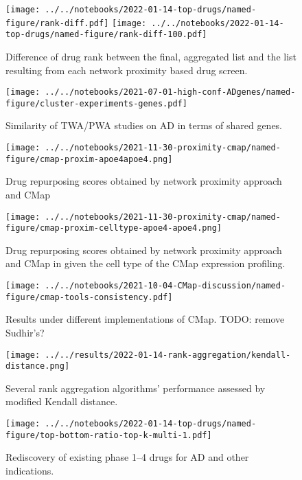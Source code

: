 \documentclass[letterpaper]{article}
\begin{document}
\begin{figure}[p]
\texttt{[image: ../../notebooks/2022-01-14-top-drugs/named-figure/rank-diff.pdf]}
\texttt{[image: ../../notebooks/2022-01-14-top-drugs/named-figure/rank-diff-100.pdf]}
\caption{
Difference of drug rank between the final, aggregated list and the list
resulting from each network proximity based drug screen.
}
\label{fig:rank-diff}
\end{figure}


\begin{figure}
\texttt{[image: ../../notebooks/2021-07-01-high-conf-ADgenes/named-figure/cluster-experiments-genes.pdf]}
\caption{
Similarity of TWA/PWA studies on AD in terms of shared genes.
}
\label{fig:twas-clustermap}
\end{figure}

\begin{figure}[p]
\texttt{[image: ../../notebooks/2021-11-30-proximity-cmap/named-figure/cmap-proxim-apoe4apoe4.png]}
\caption{
Drug repurposing scores obtained by network proximity approach and CMap
}
\label{fig:proxim-cmap}
\end{figure}

\begin{figure}[p]
\texttt{[image: ../../notebooks/2021-11-30-proximity-cmap/named-figure/cmap-proxim-celltype-apoe4-apoe4.png]}
\caption{
Drug repurposing scores obtained by network proximity approach and CMap in
given the cell type of the CMap expression profiling.
}
\label{fig:proxim-cmap-celltype}
\end{figure}

\begin{figure}[p]
\texttt{[image: ../../notebooks/2021-10-04-CMap-discussion/named-figure/cmap-tools-consistency.pdf]}
\caption{
Results under different implementations of CMap.
TODO: remove Sudhir's?
}
\label{fig:cmap-cmap}
\end{figure}

\begin{figure}[p]
\texttt{[image: ../../results/2022-01-14-rank-aggregation/kendall-distance.png]}
\caption{
Several rank aggregation algorithms' performance assessed by modified Kendall
distance.
}
\label{fig:kendall-dist}
\end{figure}

\begin{figure}[p]
\texttt{[image: ../../notebooks/2022-01-14-top-drugs/named-figure/top-bottom-ratio-top-k-multi-1.pdf]}
\caption{
Rediscovery of existing phase 1--4 drugs for AD and other indications.
}
\label{fig:ad-drug-rediscovery-multi}
\end{figure}
\end{document}
